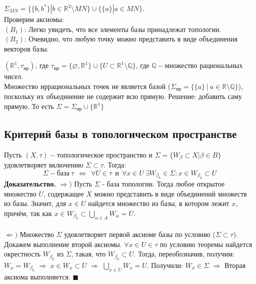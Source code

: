 \begin{example}
$\Sigma_{MN}=\{\{b,b^*\}|b{\in}\mathbb{R}^2\setminus MN\}{\cup}\{\{a\}|a{\in}MN\}$.\\Проверим аксиомы:\\
$(B_1)$: Легко увидеть, что все элементы базы принадлежат топологии.\\
$(B_2)$: Очевидно, что любую точку можно представить в виде объединения векторов базы.
\end{example}
\begin{example}
$(\mathbb{R}^1,\tau_{\text{ир}})$, где $\tau_{\text{ир}}=\{\varnothing,\mathbb{R}^1\}{\cup}\{U{\subset}\mathbb{R}^1\setminus\mathbb{Q}\}$, где $\mathbb{Q}-$множество рациональных чисел.\\
Множество иррациональных точек не является базой ($\Sigma_{\text{ир}}=\{\{a\}\ |\ a{\in}\mathbb{R}\setminus\mathbb{Q}\}$), поскольку их объединение не содержит всю прямую. Решение: добавить саму прямую. То есть $\Sigma=\Sigma_{\text{ир}}{\cup}\{\mathbb{R}^1\}$
\end{example}
\subsection{Критерий базы в топологическом пространстве}
\begin{theorem}
Пусть $(X,\tau)-$топологическое пространство и $\Sigma=\{W_{\beta}{\subset}X|\beta{\in}B\}$ удовлетворяет включению $\Sigma{\subset}\tau$. Тогда: 
$$\Sigma-\text{база}\ \tau\ \ {\Leftrightarrow}\ \ \forall U{\in}\tau\ \ \text{и}\ \ \forall x{\in}U\ \exists W_{\beta_0}{\in}\Sigma: x{\in}W_{\beta_0}{\subset}U$$
\textbf{Доказательство.} $\Rightarrow)$ Пусть $\Sigma$ - база топологии. Тогда любое открытое множество $U$, содержащее $X$ можно представить в виде объединений множеств из базы. Значит, для $x\in U$ найдется множество из базы, в котором лежит $x$, причём, так как $x{\in}W_{\beta_0}{\subset}\bigcup\limits_{\alpha{\in}A}W_{\alpha}=U$.\\\\
$\Leftarrow)$ Множество $\Sigma$ удовлетворяет первой аксиоме базы по условию ($\Sigma{\subset}\tau$).
Докажем выполнение второй аксиомы. $\forall x{\in}U{\in}\tau$ по условию теоремы найдется окрестность $W_{\beta_0}$  из $\Sigma$, такая, что $W_{\beta_0}{\subset}U$. Тогда, переобозначив, получим: $W_x=W_{\beta_0}$ $\Rightarrow$ $x{\in}W_x{\subset}U$ $\Rightarrow$ $\bigcup\limits_{x{\in}U}W_x=U$. Получили: $W_{x}{\in}\Sigma$ $\Rightarrow$ Вторая аксиома выполняется. $\blacksquare$ 
\end{theorem}
